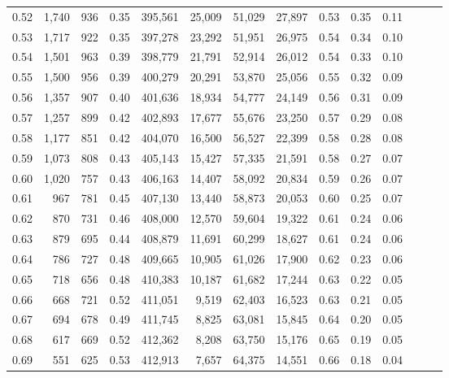 \begin{tabular}{rrrrrrrrrrrrrr}
0.52 &   1,740 &    936 &  0.35 &  395,561 &   25,009 &  51,029 &  27,897 &  0.53 &  0.35 &      0.11 \\
0.53 &   1,717 &    922 &  0.35 &  397,278 &   23,292 &  51,951 &  26,975 &  0.54 &  0.34 &      0.10 \\
0.54 &   1,501 &    963 &  0.39 &  398,779 &   21,791 &  52,914 &  26,012 &  0.54 &  0.33 &      0.10 \\
0.55 &   1,500 &    956 &  0.39 &  400,279 &   20,291 &  53,870 &  25,056 &  0.55 &  0.32 &      0.09 \\
0.56 &   1,357 &    907 &  0.40 &  401,636 &   18,934 &  54,777 &  24,149 &  0.56 &  0.31 &      0.09 \\
0.57 &   1,257 &    899 &  0.42 &  402,893 &   17,677 &  55,676 &  23,250 &  0.57 &  0.29 &      0.08 \\
0.58 &   1,177 &    851 &  0.42 &  404,070 &   16,500 &  56,527 &  22,399 &  0.58 &  0.28 &      0.08 \\
0.59 &   1,073 &    808 &  0.43 &  405,143 &   15,427 &  57,335 &  21,591 &  0.58 &  0.27 &      0.07 \\
0.60 &   1,020 &    757 &  0.43 &  406,163 &   14,407 &  58,092 &  20,834 &  0.59 &  0.26 &      0.07 \\
0.61 &     967 &    781 &  0.45 &  407,130 &   13,440 &  58,873 &  20,053 &  0.60 &  0.25 &      0.07 \\
0.62 &     870 &    731 &  0.46 &  408,000 &   12,570 &  59,604 &  19,322 &  0.61 &  0.24 &      0.06 \\
0.63 &     879 &    695 &  0.44 &  408,879 &   11,691 &  60,299 &  18,627 &  0.61 &  0.24 &      0.06 \\
0.64 &     786 &    727 &  0.48 &  409,665 &   10,905 &  61,026 &  17,900 &  0.62 &  0.23 &      0.06 \\
0.65 &     718 &    656 &  0.48 &  410,383 &   10,187 &  61,682 &  17,244 &  0.63 &  0.22 &      0.05 \\
0.66 &     668 &    721 &  0.52 &  411,051 &    9,519 &  62,403 &  16,523 &  0.63 &  0.21 &      0.05 \\
0.67 &     694 &    678 &  0.49 &  411,745 &    8,825 &  63,081 &  15,845 &  0.64 &  0.20 &      0.05 \\
0.68 &     617 &    669 &  0.52 &  412,362 &    8,208 &  63,750 &  15,176 &  0.65 &  0.19 &      0.05 \\
0.69 &     551 &    625 &  0.53 &  412,913 &    7,657 &  64,375 &  14,551 &  0.66 &  0.18 &      0.04 \\

\end{tabular}
